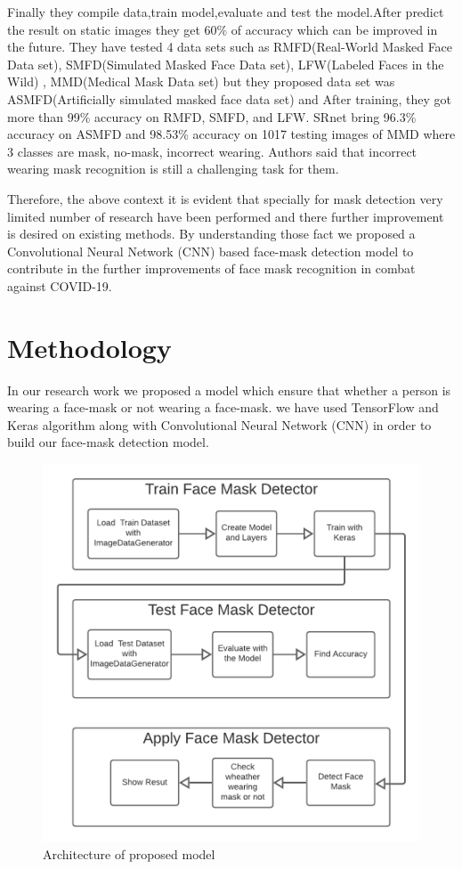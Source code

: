 \documentclass[conference]{IEEEtran}
\begin{document}
Finally they compile data,train model,evaluate and test the model.After predict the result on static images they get 60\% of accuracy which can be improved in the future\cite{E2}. They  have tested 4 data sets such as  RMFD(Real-World Masked Face Data set), SMFD(Simulated Masked Face Data set), LFW(Labeled Faces in the Wild) , MMD(Medical Mask Data set) but they  proposed data set was ASMFD(Artificially simulated masked face data set) and After 
training, they  got more than 99\% accuracy on RMFD, SMFD, and LFW. SRnet bring 96.3\% accuracy on ASMFD and 98.53\% accuracy on 1017 testing images of MMD where 3 classes are mask, no-mask, incorrect wearing\cite{A2}. Authors said that incorrect wearing  mask recognition is still a challenging task for them\cite{A2}\cite{E2}\cite{suresh2021face}.

Therefore, the above context it is evident that specially for mask detection very limited number of research have been performed and there further improvement is desired on existing methods. By understanding those fact we proposed a Convolutional Neural Network (CNN) based face-mask detection model to contribute  in the further improvements of face mask recognition in combat against COVID-19.

\section{Methodology}
In our research work we proposed  a model which ensure that whether a person is wearing a face-mask or not wearing a face-mask. we have used TensorFlow and Keras algorithm along with Convolutional Neural Network (CNN) in order to build our face-mask detection model.
\begin{center}
\begin{figure}[htbp]
  \includegraphics[width=1.0\linewidth]{UpdatedBlockDiagram.pdf}
  \caption{ Architecture of proposed model }
  \label{fig:fig1}
\end{figure}
\end{center}
\end{document}
